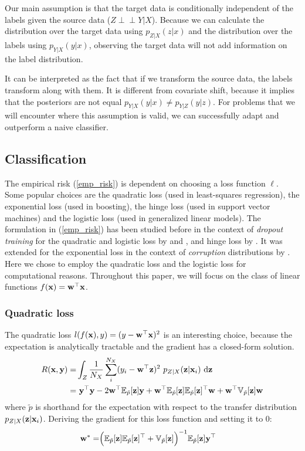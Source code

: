 \documentclass[twoside,11pt]{article}
\def\ci{\perp\!\!\!\perp}
\begin{document}
Our main assumption is that the target data is conditionally independent of the labels given the source data ($Z \ci Y | X$). Because we can calculate the distribution over the target data using $p_{Z|X}(z|x)$ and the distribution over the labels using $p_{Y|X}(y|x)$, observing the target data will not add information on the label distribution. 

It can be interpreted as the fact that if we transform the source data, the labels transform along with them. It is different from covariate shift, because it implies that the posteriors are not equal $p_{Y|X}(y|x) \neq p_{Y|Z}(y|z)$. For problems that we will encounter where this assumption is valid, we can successfully adapt and outperform a naive classifier.

\subsection{Classification}
The empirical risk (\ref{emp_risk}) is dependent on choosing a loss function $\ell$. Some popular choices are the quadratic loss (used in least-squares regression), the exponential loss (used in boosting), the hinge loss (used in support vector machines) and the logistic loss (used in generalized linear models). The formulation in (\ref{emp_risk}) has been studied before in the context of \emph{dropout training} for the quadratic and logistic loss by \cite{wager2013dropout} and \cite{rostamizadeh2011learning}, and hinge loss by \cite{chen2014dropout}. It was extended for the exponential loss in the context of \emph{corruption} distributions by \cite{van2013learning}. Here we chose to employ the quadratic loss and the logistic loss for computational reasons.
Throughout this paper, we will focus on the class of linear functions $f({\bf x}) = {\bf w^{\top}x}$.

\subsubsection{Quadratic loss}
The quadratic loss $l(f({\bf x}),y)=(y-{\bf w}^{\top}{\bf x})^{2}$ is an interesting choice, because the expectation is analytically tractable and the gradient has a closed-form solution.
\begin{align}
	R({\bf x},{\bf y}) =& \int_{Z} \frac{1}{N_{X}}\sum_{i}^{N_{X}} (y_{i}-{\bf w}^{\top} {\bf z})^{2} \ p_{Z|X}({\bf z}|{\bf x}_{i}) \ \mathrm{d}{\bf z} \nonumber \\
	=& \  {\bf y^{\top}y} - 2{\bf w}^{\top}\mathbb{E}_{\tilde{p}}[{\bf z]y} + {\bf w}^{\top}\mathbb{E}_{\tilde{p}}[{\bf z}]\mathbb{E}_{\tilde{p}}[{\bf z]^{\top}w}   + {\bf w}^{\top}\mathbb{V}_{\tilde{p}}[{\bf z]w} \label{qd_loss}
\end{align}
where $\tilde{p}$ is shorthand for the expectation with respect to the transfer distribution $p_{Z|X}({\bf z}|{\bf x}_{i})$. Deriving the gradient for this loss function and setting it to $0$:
\begin{align}
{\bf w}^{*} =& \Big( \mathbb{E}_{\tilde{p}}[{\bf z}] \mathbb{E}_{\tilde{p}}[{\bf z}]^{\top} + \mathbb{V}_{\tilde{p}}[{\bf z}] \Big)^{-1} \mathbb{E}_{\tilde{p}}[{\bf z}]{\bf y}^{\top}
\end{align}
\end{document}
